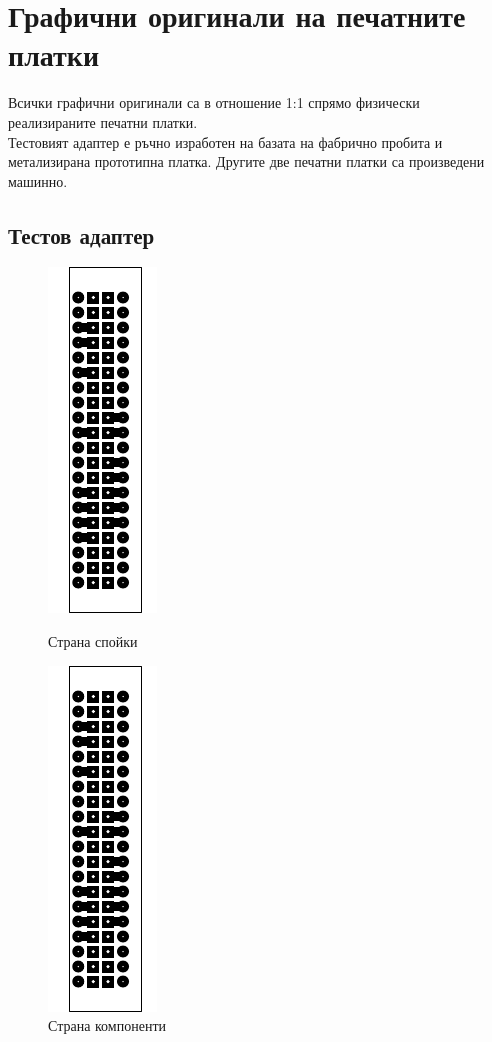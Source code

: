 \section{Графични оригинали на печатните платки}
Всички графични оригинали са в отношение 1:1 спрямо физически реализираните печатни платки.\\
Тестовият адаптер е ръчно изработен на базата на фабрично пробита и метализирана прототипна платка. Другите две печатни платки са произведени машинно.
\FloatBarrier
\subsection{Тестов адаптер}
\begin{figure}[!htbp]
    \begin{minipage}{0.49\linewidth}
        \centering
        \includegraphics[page=1]{documents/dev_board.pdf}
        \caption{Страна спойки}
        \label{fig:dev_top}
    \end{minipage}
    \hfill
    \begin{minipage}{0.49\linewidth}
        \centering
        \includegraphics[page=2]{documents/dev_board.pdf}
        \caption{Страна компоненти}
        \label{fig:dev_bot}
    \end{minipage}
\end{figure}
